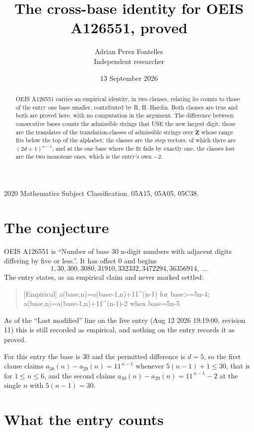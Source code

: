 \documentclass[11pt,a4paper]{article}
\title{The cross-base identity for OEIS A126551, proved}
\author{Adrian Perez Fontelles\\ \small Independent researcher}
\date{13 September 2026}
\theoremstyle{plain}
\theoremstyle{definition}
\begin{document}
\maketitle

\begin{abstract}
OEIS A126551 carries an empirical identity, in two clauses, relating its counts to those of the
entry one base smaller, contributed by R. H. Hardin. Both clauses are true and both are proved
here, with no computation in the argument. The difference between consecutive bases counts the
admissible strings that USE the new largest digit; those are the translates of the
translation-classes of admissible strings over $\mathbf{Z}$ whose range fits below the top of
the alphabet; the classes are the step vectors, of which there are $(2d+1)^{n-1}$; and at the
one base where the fit fails by exactly one, the classes lost are the two monotone ones, which
is the entry's own $-2$.
\end{abstract}

\noindent\small 2020 Mathematics Subject Classification. 05A15, 05A05, 05C38.\normalsize

\section{The conjecture}

OEIS A126551 is ``Number of base 30 n-digit numbers with adjacent digits differing by five or less.''. It has offset $0$ and begins
\[
1, 30, 300, 3080, 31910, 332332, 3472294, 36356914,\ \dots
\]
The entry states, as an empirical claim and never marked settled:
\begin{quote}
[Empirical] a(base,n)=a(base-1,n)+11\textasciicircum{}(n-1) for base>=5n-4; a(base,n)=a(base-1,n)+11\textasciicircum{}(n-1)-2 when base=5n-5
\end{quote}
As of the ``Last modified'' line on the live entry (Aug 12 2026 19:19:00, revision 11)
this is still recorded as empirical, and nothing on the entry records it as proved.

For this entry the base is $30$ and the permitted difference is $d=5$, so the first clause
claims $a_{30}(n)-a_{29}(n)=11^{\,n-1}$ whenever $5(n-1)+1\le30$, that is for
$1\le n\le6$, and the second claims $a_{30}(n)-a_{29}(n)=11^{\,n-1}-2$ at the single
$n$ with $5(n-1)=30$.

\section{What the entry counts}
\end{document}
